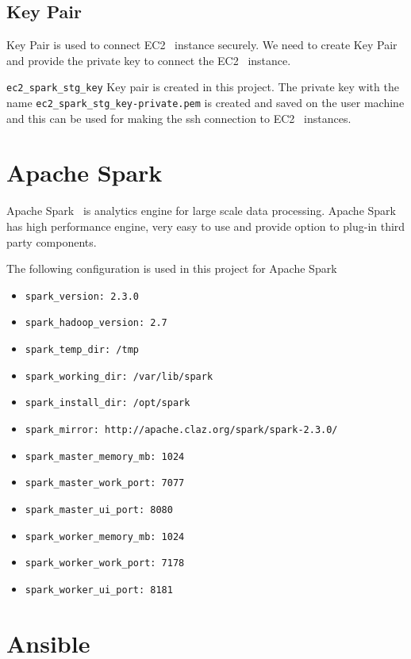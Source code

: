 \subsection{Key Pair}

Key Pair is used to connect EC2~\cite{hid-sp18-511-www-ec2} instance
securely. We need to create Key Pair and provide the private key to
connect the EC2~\cite{hid-sp18-511-www-ec2} instance.

\verb|ec2_spark_stg_key| Key pair is created in this project.
The private key with the name \verb|ec2_spark_stg_key-private.pem| is
created and saved on the user machine and this can be used for making
the ssh connection to EC2~\cite{hid-sp18-511-www-ec2} instances.

\section{Apache Spark}

Apache Spark~\cite{hid-sp18-511-www-spark} is analytics engine for
large scale data processing. Apache
Spark~\cite{hid-sp18-511-www-spark} has high performance engine, very
easy to use and provide option to plug-in third party components.

The following configuration is used in this project for Apache Spark

\begin{itemize}
	\item \verb|spark_version: 2.3.0|
	\item \verb|spark_hadoop_version: 2.7|
	\item \verb|spark_temp_dir: /tmp|
	\item \verb|spark_working_dir: /var/lib/spark|
	\item \verb|spark_install_dir: /opt/spark|
	\item \verb|spark_mirror: http://apache.claz.org/spark/spark-2.3.0/|
	\item \verb|spark_master_memory_mb: 1024|
	\item \verb|spark_master_work_port: 7077|
	\item \verb|spark_master_ui_port: 8080|
	\item \verb|spark_worker_memory_mb: 1024|
	\item \verb|spark_worker_work_port: 7178|
	\item \verb|spark_worker_ui_port: 8181|
\end{itemize}

\section{Ansible}

